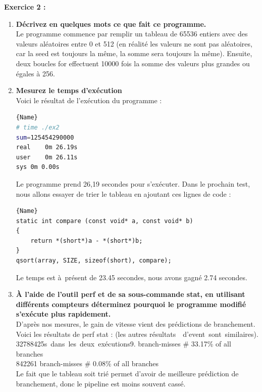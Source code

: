 \documentclass[
	a4paper, %
	10pt, %
]{CSUniSchoolLabReport}
\begin{document}
\textbf{Exercice 2 :}
\begin{enumerate}[label=\textbf{\arabic*}]

\item \textbf{Décrivez en quelques mots ce que fait ce programme.}\\
Le programme commence par remplir un tableau de 65536 entiers avec des valeurs aléatoires entre 0 et 512 (en réalité les valeurs ne sont pas aléatoires, car la seed est toujours la m\^eme, la somme sera toujours la m\^eme).
Ensuite, deux boucles for effectuent 10000 fois la somme des valeurs plus grandes ou \'egales à 256.

\item \textbf{Mesurez le temps d’exécution}\\
Voici le r\'esultat de l'ex\'ecution du programme :


\begin{lstlisting}[language=bash, firstnumber=1]{Name}
# time ./ex2 
sum=125454290000
real	0m 26.19s
user	0m 26.11s
sys	0m 0.00s
\end{lstlisting}

Le programme prend 26,19 secondes pour s'ex\'ecuter.
Dans le prochain test, nous allons essayer de trier le tableau en ajoutant ces lignes de code :
\begin{lstlisting}[style=CStyle, caption=Code modifié, firstnumber=1]{Name}
static int compare (const void* a, const void* b)
{
    return *(short*)a - *(short*)b;
}
qsort(array, SIZE, sizeof(short), compare);
\end{lstlisting}

Le temps est \`a\ pr\'esent de 23.45 secondes, nous avons gagn\'e 2.74 secondes.

\item \textbf{À l’aide de l’outil perf et de sa sous-commande stat, en utilisant différents compteurs déterminez pourquoi le programme modifié s’exécute plus rapidement.}\\

D'apr\`es nos mesures, le gain de vitesse vient des pr\'edictions de branchement.
Voici les r\'esultats de perf stat : (les autres r\'esultats\ \ d'event\ sont\ similaires).\\
32788425s\ dans\ les\ deux\ ex\'ecutions9.      branch-misses             \#   33.17\% of all branches\\
842261         branch-misses             \#    0.08\% of all branches\\

Le fait que le tableau soit trié permet d'avoir de meilleure pr\'ediction de branchement, donc le pipeline est moins souvent cassé.
\end{enumerate}
\end{document}
